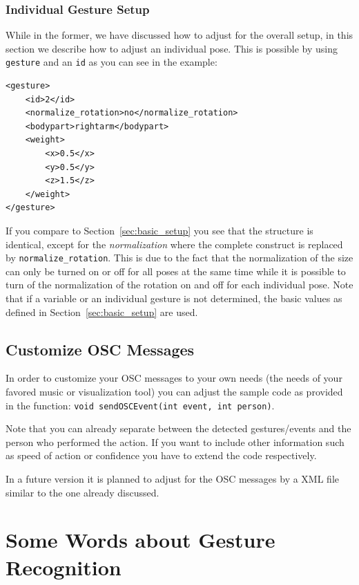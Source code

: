 \documentclass[titlepage,12pt,a4paper]{article}
\begin{document}
\subsubsection{Individual Gesture Setup}
While in the former, we have discussed how to adjust for the overall setup, in this section we describe how to adjust an individual pose. This is possible by using \texttt{gesture} and an \texttt{id} as you can see in the example:
\begin{verbatim}
<gesture>
    <id>2</id>
    <normalize_rotation>no</normalize_rotation>
    <bodypart>rightarm</bodypart>
    <weight>
        <x>0.5</x>
        <y>0.5</y>
        <z>1.5</z>
    </weight> 
</gesture> 
\end{verbatim}
If you compare to Section~\ref{sec:basic_setup} you see that the structure is identical, except for the \emph{normalization} where the complete construct is replaced by \texttt{normalize\_rotation}. 
This is due to the fact that the normalization of the size can only be turned on or off for all poses at the same time while it is possible to turn of the normalization of the rotation on and off for each individual pose.
Note that if a variable or an individual gesture is not determined, the basic values as defined in Section~\ref{sec:basic_setup} are used.

\subsection{Customize OSC Messages}

In order to customize your OSC messages to your own needs (the needs of your favored music or visualization tool) you can adjust the sample code as provided in the function: \texttt{void sendOSCEvent(int event, int person)}.

Note that you can already separate between the detected gestures/events and the person who performed the action. If you want to include other information such as speed of action or confidence you have to extend the code respectively.

In a future version it is planned to adjust for the OSC messages by a XML file similar to the one already discussed.

\newpage

 \section{Some Words about Gesture Recognition}
\end{document}
